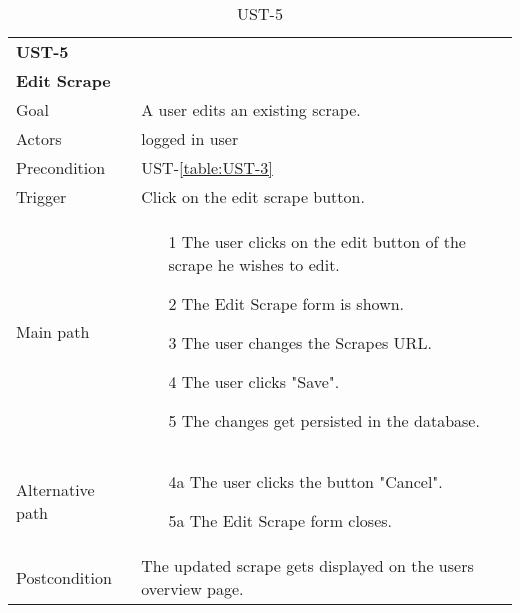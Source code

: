 \documentclass[titlepage, 12pt]{article}
\begin{document}
  \begin{table}[H]
    \begin{center}

      \begin{tabular}{p{4cm}|p{10cm}}
        \textbf{UST-5}\\ \textbf{Edit Scrape}                                            \\
        \hline
        Goal             & A user edits an existing scrape.                  \\
        \hline
        Actors           & logged in user                                               \\
        \hline
        Precondition     & UST-\ref{table:UST-3}                                     \\
        \hline
        Trigger          & Click on the edit scrape button.                            \\
        \hline
        Main path        &
        \begin{itemize}
          \item [1] The user clicks on the edit button of the scrape he wishes to edit.
          \item [2] The Edit Scrape form is shown.
          \item [3] The user changes the Scrapes URL.
          \item [4] The user clicks "Save".
          \item [5] The changes get persisted in the database.
        \end{itemize}                                                         \\
        \hline
        Alternative path &
        \begin{itemize}
          \item [4a] The user clicks the button "Cancel".
          \item [5a] The Edit Scrape form closes.
        \end{itemize}                                                         \\
        \hline
        Postcondition    & The updated scrape gets displayed on the users overview page. \\
      \end{tabular}

      \caption{UST-5}
      \label{table:UST-5}

    \end{center}
  \end{table}
\end{document}
